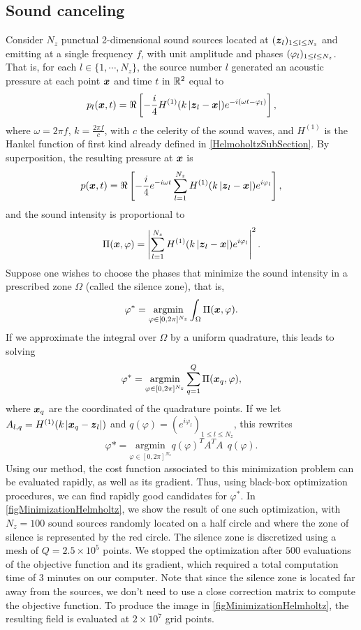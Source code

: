 \documentclass{article}
\begin{document}
\subsection{Sound canceling}
																																																		
Consider $N_z$ punctual 2-dimensional sound sources located at $(\boldsymbol{z}_{l})_{1 \leq l \leq N_z}$  and emitting at a single frequency $f$, with unit amplitude and phases $(\varphi_{l})_{1 \leq l \leq N_z}$. That is, for each $l \in \{1,\cdots, N_z\}$, the source number $l$ generated an acoustic pressure at each point $\boldsymbol{x}$ and time $t$ in $\mathbb{R}^2$ equal to 
\[p_l(\boldsymbol{x},t) = \Re\left[-\frac{i}{4}H^{(1)}(k\left\lvert \boldsymbol{z}_l - \boldsymbol{x} \right\rvert) e^{-i\left(\omega t - \varphi_l \right)}\right],\]
where $\omega = 2\pi f$, $k = \frac{2\pi f}{c}$, with $c$ the celerity of the sound waves, and $H^{(1)}$ is the Hankel function of first kind already defined in \autoref{HelmoholtzSubSection}. 
By superposition, the resulting pressure at $\boldsymbol{x}$ is 
\[p(\boldsymbol{x},t) = \Re\left[ -\frac{i}{4}e^{-i \omega t} \sum_{l=1}^{N_z} H^{(1)}(k\left\lvert \boldsymbol{z}_l - \boldsymbol{x} \right\rvert)e^{i \varphi_l} \right],\]
and the sound intensity is proportional to
\[\Pi(\boldsymbol{x},\varphi) =  \left\lvert  \sum_{l=1}^{N_z} H^{(1)}(k\left\lvert \boldsymbol{z}_l - \boldsymbol{x} \right\rvert)e^{i \varphi_l}  \right\rvert^2.\]
Suppose one wishes to choose the phases that minimize the sound intensity in a prescribed zone $\Omega$ (called the silence zone), that is,
\[ \varphi^* = \underset{\varphi \in [0,2\pi]^{N_z}}{\text{argmin}}\int_{\Omega}\Pi(\boldsymbol{x},\varphi). \]
If we approximate the integral over $\Omega$ by a uniform quadrature, this leads to solving 
\[\varphi^* = \underset{\varphi \in [0,2\pi]^{N_z}}{\text{argmin}} \sum_{q=1}^{Q}\Pi(\boldsymbol{x}_q,\varphi), \]
where $\boldsymbol{x}_q$ are the coordinated of the quadrature points. If we let $A_{l,q} = H^{(1)}(k\left\lvert \boldsymbol{x}_q - \boldsymbol{z}_l \right\rvert)$ and $q(\varphi) = \left(e^{i\varphi_l}\right)_{1 \leq l \leq N_z}$, this rewrites
\[ \varphi* = \underset{\varphi \in [0,2\pi]^{N_z}}{\text{argmin}} q(\varphi)^T A^T A ~ ~ q(\varphi).\]
Using our method, the cost function associated to this minimization problem can be evaluated rapidly, as well as its gradient. Thus, using black-box optimization procedures, we can find rapidly good candidates for $\varphi^*$. In \autoref{figMinimizationHelmholtz}, we show the result of one such optimization, with $N_z=100$ sound sources randomly located on a half circle and where the zone of silence is represented by the red circle. The silence zone is discretized using a mesh of $Q = 2.5\times 10^5$ points. We stopped the optimization after $500$ evaluations of the objective function and its gradient, which required a total computation time of 3 minutes on our computer. Note that since the silence zone is located far away from the sources, we don't need to use a close correction matrix to compute the objective function. To produce the image in \autoref{figMinimizationHelmholtz}, the resulting field is evaluated at $2 \times 10^7$ grid points.
																																																		
\end{document}
